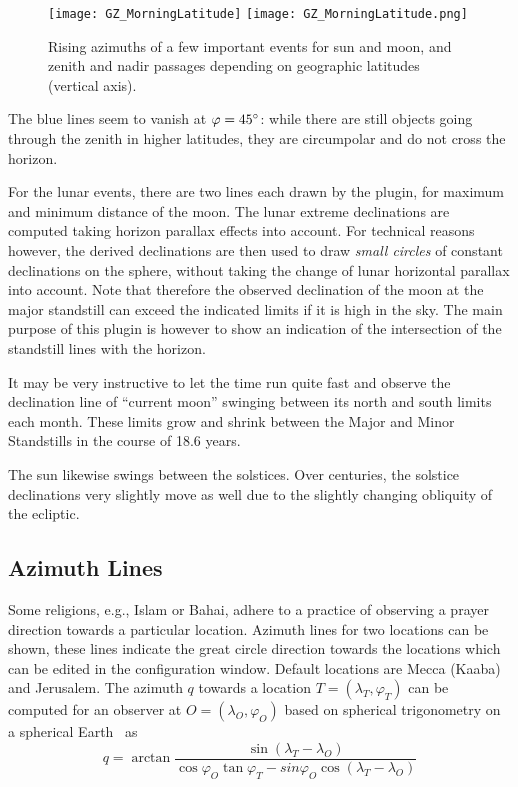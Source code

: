 \begin{figure}[t]
\ifpdf
\texttt{[image: GZ\_MorningLatitude]}
\else
\texttt{[image: GZ\_MorningLatitude.png]}
\fi
\caption{Rising azimuths of a few important events for sun and moon,
  and zenith and nadir passages depending on geographic latitudes
  (vertical axis).}
\label{fig:plugin:ArchaeoLines:MorningLatitudes}
\end{figure}

The blue lines seem to vanish at $\varphi=45\degree$: while there are
still objects going through the zenith in higher latitudes, they are
circumpolar and do not cross the horizon.

For the lunar events, there are two lines each drawn by the plugin,
for maximum and minimum distance of the moon.  The lunar extreme
declinations are computed taking horizon parallax effects into
account. For technical reasons however, the derived declinations are
then used to draw \emph{small circles} of constant declinations on the
sphere, without taking the change of lunar horizontal parallax into
account.  Note that therefore the observed declination of the moon at
the major standstill can exceed the indicated limits if it is high in
the sky. The main purpose of this plugin is however to show an
indication of the intersection of the standstill lines with the
horizon.

It may be very instructive to let the time run quite fast and observe
the declination line of ``current moon'' swinging between its north
and south limits each month.  These limits grow and shrink between the
Major and Minor Standstills in the course of 18.6 years.

The sun likewise swings between the solstices. Over centuries, the
solstice declinations very slightly move as well due to the slightly
changing obliquity of the ecliptic.

\subsection{Azimuth Lines}
\label{sec:plugin:ArchaeoLines:Azimuths}

Some religions, e.g., Islam or Bahai, adhere to a practice of
observing a prayer direction towards a particular location.  Azimuth
lines for two locations can be shown, these lines indicate the great
circle direction towards the locations which can be edited in the
configuration window. Default locations are Mecca (Kaaba) and
Jerusalem.  The azimuth $q$ towards a location $T=(\lambda_T,
\varphi_T)$ can be computed for an observer at $O=(\lambda_O, \varphi_O)$
based on spherical trigonometry on a spherical
Earth~\citep{Abdali:1997} as
\begin{equation}
  \label{eq:qibla}
  q=\arctan \frac{\sin (\lambda_{T} - \lambda_O) } { \cos\varphi_O \tan\varphi_T - sin \varphi_O \cos(\lambda_{T} - \lambda_O) }
\end{equation}

